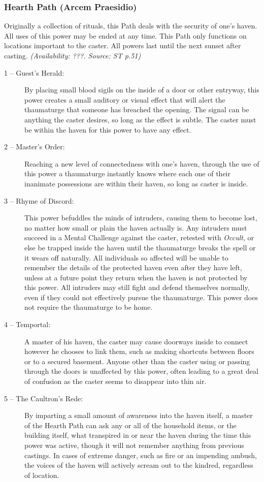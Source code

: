 \subsubsection{Hearth Path (Arcem Praesidio)}
Originally a collection of rituals, this Path deals with the security of one's haven.  All uses of this power 
may be ended at any time.  This Path only functions on locations important to the caster.  All powers last 
until the next sunset after casting.  \emph{(Availability: ???.  Source: ST p.51)}

\begin{description}
	\item[1 -- Guest's Herald:]  By placing small blood sigils on the inside of a door or other entryway, this 
	power creates a small auditory or visual effect that will alert the thaumaturge that someone has breached 
	the opening.  The signal can be anything the caster desires, so long as the effect is subtle.  The caster 
	must be within the haven for this power to have any effect.
	\item[2 -- Master's Order:]  Reaching a new level of connectedness with one's haven, through the use of this 
	power a thaumaturge instantly knows where each one of their inanimate possessions are within their haven, so 
	long as caster is inside.
	\item[3 -- Rhyme of Discord:]  This power befuddles the minds of intruders, causing them to become lost, 
	no matter how small or plain the haven actually is.  Any intruders must succeed in a Mental Challenge against 
	the caster, retested with \emph{Occult}, or else be trapped inside the haven until the thaumaturge breaks 
	the spell or it wears off naturally.  All individuals so affected will be unable to remember the details of 
	the protected haven even after they have left, unless at a future point they return when the haven is not 
	protected by this power.  All intruders may still fight and defend themselves normally, even if they could 
	not effectively pursue the thaumaturge.  This power does not require the thaumaturge to be home.
	\item[4 -- Temportal:]  A master of his haven, the caster may cause doorways inside to connect however he 
	chooses to link them, such as making shortcuts between floors or to a secured basement.  Anyone other than the 
	caster using or passing through the doors is unaffected by this power, often leading to a great deal of 
	confusion as the caster seems to disappear into thin air.
	\item[5 -- The Caultron's Rede:]  By imparting a small amount of awareness into the haven itself, a 
	master of the Hearth Path can ask any or all of the household items, or the building itself, what transpired in 
	or near the haven during the time this power was active, though it will not remember anything from previous 
	castings.  In cases of extreme danger, such as fire or an impending ambush, the voices of the haven will 
	actively scream out to the kindred, regardless of location.
\end{description}

